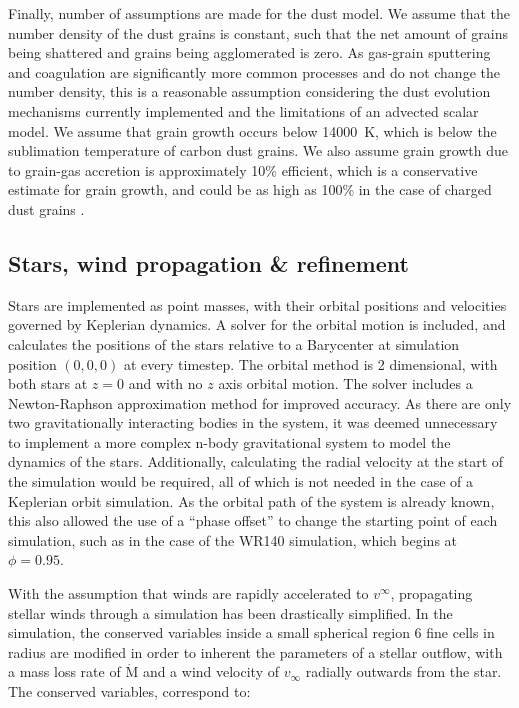 Finally, number of assumptions are made for the dust model.
We assume that the number density of the dust grains is constant, such that the net amount of grains being shattered and grains being agglomerated is zero.
As gas-grain sputtering and coagulation are significantly more common processes and do not change the number density, this is a reasonable assumption considering the dust evolution mechanisms currently implemented and the limitations of an advected scalar model.
We assume that grain growth occurs below \SI{14000}{K}, which is below the sublimation temperature of carbon dust grains.
We also assume grain growth due to grain-gas accretion is approximately 10\% efficient, which is a conservative estimate for grain growth, and could be as high as 100\% in the case of charged dust grains \parencite[Ch.~9]{spitzerPhysicalProcessesInterstellar2008}.

\subsection{Stars, wind propagation \& refinement}

Stars are implemented as point masses, with their orbital positions and velocities governed by Keplerian dynamics.
A solver for the orbital motion is included, and calculates the positions of the stars relative to a Barycenter at simulation position $(0,0,0)$ at every timestep.
The orbital method is 2 dimensional, with both stars at $z=0$ and with no $z$ axis orbital motion.
The solver includes a Newton-Raphson approximation method for improved accuracy.
As there are only two gravitationally interacting bodies in the system, it was deemed unnecessary to implement a more complex n-body gravitational system to model the dynamics of the stars.
Additionally, calculating the radial velocity at the start of the simulation would be required, all of which is not needed in the case of a Keplerian orbit simulation.
As the orbital path of the system is already known, this also allowed the use of a ``phase offset'' to change the starting point of each simulation, such as in the case of the WR140 simulation, which begins at $\phi = 0.95$.

With the assumption that winds are rapidly accelerated to $v^\infty$, propagating stellar winds through a simulation has been drastically simplified.
In the simulation, the conserved variables inside a small spherical region 6 fine cells in radius are modified in order to inherent the parameters of a stellar outflow, with a mass loss rate of $\dot{\text{M}}$ and a wind velocity of $v_\infty$ radially outwards from the star.
The conserved variables, correspond to:

